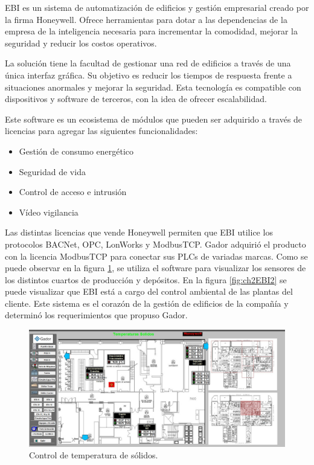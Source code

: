 EBI es un sistema de automatización de edificios y gestión empresarial creado por la firma Honeywell.
Ofrece herramientas para dotar a las dependencias de la empresa de la inteligencia necesaria para incrementar la comodidad, mejorar la seguridad y reducir los costos operativos.

La solución tiene la facultad de gestionar una red de edificios a través de una única interfaz gráfica.
Su objetivo es reducir los tiempos de respuesta frente a situaciones anormales y mejorar la seguridad.
Esta tecnología es compatible con dispositivos y software de terceros, con la idea de ofrecer escalabilidad.

Este software es un ecosistema de módulos que pueden ser adquirido a través de licencias para agregar las siguientes funcionalidades:

\begin{itemize}
	\item Gestión de consumo energético
	\item Seguridad de vida
	\item Control de acceso e intrusión
	\item Vídeo vigilancia
\end{itemize}

Las distintas licencias que vende Honeywell permiten que EBI utilice los protocolos BACNet, OPC, LonWorks y ModbusTCP.
Gador adquirió el producto con la licencia ModbusTCP para conectar sus PLCs de variadas marcas.
Como se puede observar en la figura \ref{fig:ch2EBI1}, se utiliza el software para visualizar los sensores de los distintos cuartos de producción y depósitos.
En la figura \ref{fig:ch2EBI2} se puede visualizar que EBI está a cargo del control ambiental de las plantas del cliente.
Este sistema es el corazón de la gestión de edificios de la compañía y determinó los requerimientos que propuso Gador.

\begin{figure}[h]
	\centering
	\includegraphics[width=\textwidth]{./Figures/ch2EBI1.jpg}
	\caption{Control de temperatura de sólidos.}
	\label{fig:ch2EBI1}
\end{figure}

